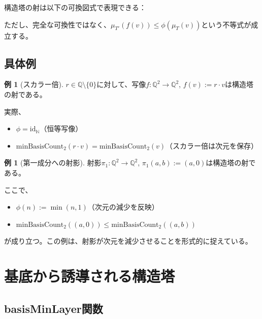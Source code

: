 \documentclass[a4paper,11pt]{ltjsarticle}
\theoremstyle{definition}
\newtheorem{example}[definition]{例}
\begin{document}
構造塔の射は以下の可換図式で表現できる：

\begin{center}
\end{center}

ただし、完全な可換性ではなく、$\mu_{T'}(f(v)) \leq \phi(\mu_T(v))$という不等式が成立する。

\subsection{具体例}

\begin{example}[スカラー倍]
$r \in \mathbb{Q} \setminus \{0\}$に対して、写像$f : \mathbb{Q}^2 \to \mathbb{Q}^2$, $f(v) := r \cdot v$は構造塔の射である。

実際、
\begin{itemize}
  \item $\phi = \mathrm{id}_{\mathbb{N}}$（恒等写像）
  \item $\mathrm{minBasisCount}_2(r \cdot v) = \mathrm{minBasisCount}_2(v)$（スカラー倍は次元を保存）
\end{itemize}
\end{example}

\begin{example}[第一成分への射影]
射影$\pi_1 : \mathbb{Q}^2 \to \mathbb{Q}^2$, $\pi_1(a, b) := (a, 0)$は構造塔の射である。

ここで、
\begin{itemize}
  \item $\phi(n) := \min(n, 1)$（次元の減少を反映）
  \item $\mathrm{minBasisCount}_2((a, 0)) \leq \mathrm{minBasisCount}_2((a, b))$
\end{itemize}
が成り立つ。この例は、射影が次元を減少させることを形式的に捉えている。
\end{example}

\section{基底から誘導される構造塔}

\subsection{basisMinLayer関数}
\end{document}
